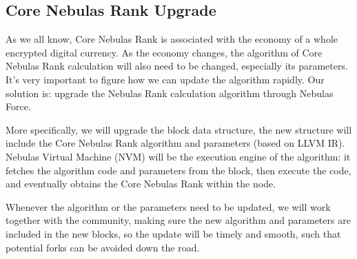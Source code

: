 \subsection{Core Nebulas Rank Upgrade}
As we all know, Core Nebulas Rank is associated with the economy of a whole encrypted digital currency. As the economy changes, the algorithm of Core Nebulas Rank calculation will also need to be changed, especially its parameters. It’s very important to figure how we can update the algorithm rapidly. Our solution is: upgrade the Nebulas Rank calculation algorithm through Nebulas Force.

More specifically, we will upgrade the block data structure, the new structure will include the Core Nebulas Rank algorithm and parameters (based on LLVM IR). Nebulas Virtual Machine (NVM) will be the execution engine of the algorithm: it fetches the algorithm code and parameters from the block, then execute the code, and eventually obtains the Core Nebulas Rank within the node.

Whenever the algorithm or the parameters need to be updated, we will work together with the community, making sure the new algorithm and parameters are included in the new blocks, so the update will be timely and smooth, such that potential forks can be avoided down the road.
